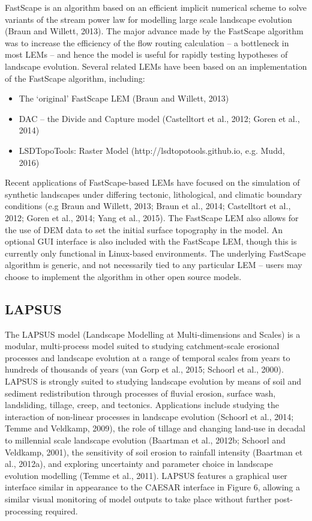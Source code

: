 FastScape is an algorithm based on an efficient implicit numerical scheme to solve variants of the stream power law for modelling large scale landscape evolution (Braun and Willett, 2013). The major advance made by the FastScape algorithm was to increase the efficiency of the flow routing calculation – a bottleneck in most LEMs – and hence the model is useful for rapidly testing hypotheses of landscape evolution. Several related LEMs have been based on an implementation of the FastScape algorithm, including:

\begin{itemize}
\item The ‘original’ FastScape LEM (Braun and Willett, 2013)
\item DAC – the Divide and Capture model (Castelltort et al., 2012; Goren et al., 2014)
\item LSDTopoTools: Raster Model (http://lsdtopotools.github.io, e.g. Mudd, 2016)
\end{itemize}
Recent applications of FastScape-based LEMs have focused on the simulation of synthetic landscapes under differing tectonic, lithological, and climatic boundary conditions (e.g Braun and Willett, 2013; Braun et al., 2014; Castelltort et al., 2012; Goren et al., 2014; Yang et al., 2015). The FastScape LEM also allows for the use of DEM data to set the initial surface topography in the model. An optional GUI interface is also included with the FastScape LEM, though this is currently only functional in Linux-based environments. The underlying FastScape algorithm is generic, and not necessarily tied to any particular LEM – users may choose to implement the algorithm in other open source models.

\subsection{LAPSUS}
The LAPSUS model (Landscape Modelling at Multi-dimensions and Scales) is a modular, multi-process model suited to studying catchment-scale erosional processes and landscape evolution at a range of temporal scales from years to hundreds of thousands of years  (van Gorp et al., 2015; Schoorl et al., 2000). LAPSUS is strongly suited to studying landscape evolution by means of soil and sediment redistribution through processes of fluvial erosion, surface wash, landsliding, tillage, creep, and tectonics. Applications include studying the interaction of non-linear processes in landscape evolution (Schoorl et al., 2014; Temme and Veldkamp, 2009), the role of tillage and changing land-use in decadal to millennial scale landscape evolution (Baartman et al., 2012b; Schoorl and Veldkamp, 2001), the sensitivity of soil erosion to rainfall intensity (Baartman et al., 2012a), and exploring uncertainty and parameter choice in landscape evolution modelling (Temme et al., 2011). LAPSUS features a graphical user interface similar in appearance to the CAESAR interface in Figure 6, allowing a similar visual monitoring of model outputs to take place without further post-processing required.  

